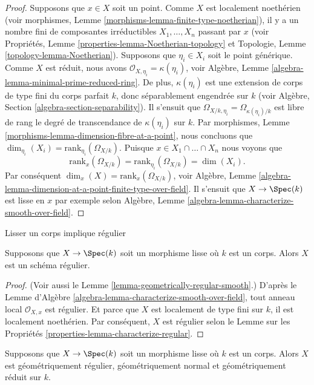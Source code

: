 \begin{proof}
Supposons que $x \in X$ soit un point. Comme $X$ est localement
noethérien (voir morphismes, Lemme
\ref{morphisms-lemma-finite-type-noetherian}), il y a un nombre
fini de composantes irréductibles $X_1, \ldots, X_n$ passant par
$x$ (voir Propriétés, Lemme
\ref{properties-lemma-Noetherian-topology} et Topologie, Lemme
\ref{topology-lemma-Noetherian}). Supposons que $\eta_i \in X_i$ soit
le point générique. Comme $X$ est réduit, nous avons $\mathcal{O}_{X,
\eta_i} = \kappa(\eta_i)$, voir Algèbre, Lemme
\ref{algebra-lemma-minimal-prime-reduced-ring}. De plus,
$\kappa(\eta_i)$ est une extension de corps de type fini du corps parfait
$k$, donc séparablement engendrée sur $k$ (voir Algèbre, Section
\ref{algebra-section-separability}). Il s'ensuit que $\Omega_{X/k, \eta_i} =
\Omega_{\kappa(\eta_i)/k}$ est libre de rang le degré de transcendance de
$\kappa(\eta_i)$ sur $k$. Par morphismes, Lemme
\ref{morphisms-lemma-dimension-fibre-at-a-point}, nous concluons que $\dim_{\eta_i}(X_i) =
\text{rank}_{\eta_i}(\Omega_{X/k})$. Puisque $x \in X_1 \cap \ldots \cap X_n$ nous voyons que
$$
\text{rank}_x(\Omega_{X/k}) = \text{rank}_{\eta_i}(\Omega_{X/k}) = \dim(X_i).
$$
Par conséquent $\dim_x(X) = \text{rank}_x(\Omega_{X/k})$, voir
Algèbre, Lemme
\ref{algebra-lemma-dimension-at-a-point-finite-type-over-field}. Il s'ensuit que $X \to \Spec(k)$
est lisse en $x$ par exemple selon Algèbre, Lemme \ref{algebra-lemma-characterize-smooth-over-field}.
\end{proof}

\begin{lemma}
\label{lemma-smooth-regular}
\begin{slogan}
Lisser un corps implique régulier
\end{slogan}
Supposons que $X \to \Spec(k)$ soit un morphisme lisse
où $k$ est un corps. Alors $X$ est un schéma régulier.
\end{lemma}

\begin{proof}
(Voir aussi le Lemme
\ref{lemma-geometrically-regular-smooth}.) D'après le
Lemme d'Algèbre
\ref{algebra-lemma-characterize-smooth-over-field}, tout
anneau local $\mathcal{O}_{X, x}$ est régulier. Et parce que
$X$ est localement de type fini sur $k$, il est localement
noethérien. Par conséquent, $X$ est régulier selon le Lemme
sur les Propriétés \ref{properties-lemma-characterize-regular}.
\end{proof}

\begin{lemma}
\label{lemma-smooth-geometrically-normal}
Supposons que $X \to \Spec(k)$ soit un morphisme lisse où
$k$ est un corps. Alors $X$ est géométriquement régulier,
géométriquement normal et géométriquement réduit sur $k$.
\end{lemma}

